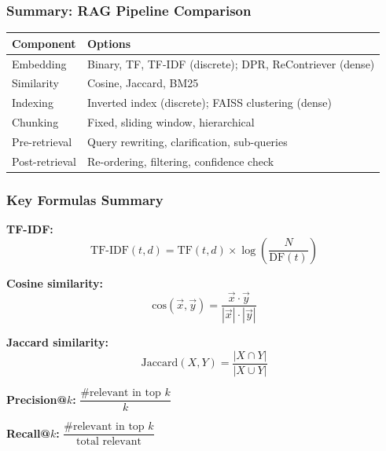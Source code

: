 \bigseparator

\subsubsection{Summary: RAG Pipeline Comparison}

\begin{center}
\renewcommand{\arraystretch}{1.3}
\begin{tabular}{@{} l p{9cm} @{}}
\toprule
\textbf{Component} & \textbf{Options} \\
\midrule
Embedding & Binary, TF, TF-IDF (discrete); DPR, ReContriever (dense) \\
Similarity & Cosine, Jaccard, BM25 \\
Indexing & Inverted index (discrete); FAISS clustering (dense) \\
Chunking & Fixed, sliding window, hierarchical \\
Pre-retrieval & Query rewriting, clarification, sub-queries \\
Post-retrieval & Re-ordering, filtering, confidence check \\
\bottomrule
\end{tabular}
\end{center}

\bigseparator

\subsubsection{Key Formulas Summary}

\begin{thmbox}
\textbf{TF-IDF:}
\[
\text{TF-IDF}(t, d) = \text{TF}(t, d) \times \log\left(\frac{N}{\text{DF}(t)}\right)
\]

\textbf{Cosine similarity:}
\[
\text{cos}(\vec{x}, \vec{y}) = \frac{\vec{x} \cdot \vec{y}}{|\vec{x}| \cdot |\vec{y}|}
\]

\textbf{Jaccard similarity:}
\[
\text{Jaccard}(X, Y) = \frac{|X \cap Y|}{|X \cup Y|}
\]

\textbf{Precision@$k$:} $\dfrac{\text{\# relevant in top } k}{k}$

\textbf{Recall@$k$:} $\dfrac{\text{\# relevant in top } k}{\text{total relevant}}$
\end{thmbox}

